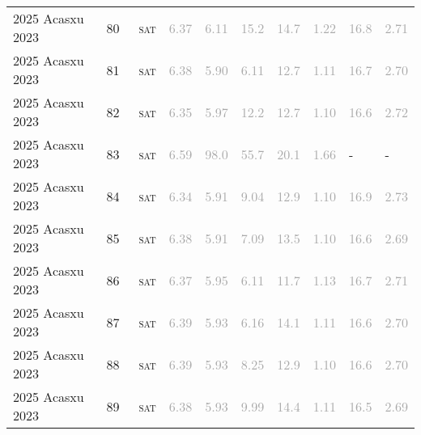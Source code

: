 \begin{center}
{\begin{longtable}{@{}llllllllll@{}}
2025 Acasxu 2023 & 80 & ~\textsc{sat} & \textcolor{darkgray}{6.37} & \textcolor{darkgray}{6.11} & \textcolor{darkgray}{15.2} & \textcolor{darkgray}{14.7} & \textcolor{darkgray}{1.22} & \textcolor{darkgray}{16.8} & \textcolor{darkgray}{2.71} \\
2025 Acasxu 2023 & 81 & ~\textsc{sat} & \textcolor{darkgray}{6.38} & \textcolor{darkgray}{5.90} & \textcolor{darkgray}{6.11} & \textcolor{darkgray}{12.7} & \textcolor{darkgray}{1.11} & \textcolor{darkgray}{16.7} & \textcolor{darkgray}{2.70} \\
2025 Acasxu 2023 & 82 & ~\textsc{sat} & \textcolor{darkgray}{6.35} & \textcolor{darkgray}{5.97} & \textcolor{darkgray}{12.2} & \textcolor{darkgray}{12.7} & \textcolor{darkgray}{1.10} & \textcolor{darkgray}{16.6} & \textcolor{darkgray}{2.72} \\
2025 Acasxu 2023 & 83 & ~\textsc{sat} & \textcolor{darkgray}{6.59} & \textcolor{darkgray}{98.0} & \textcolor{darkgray}{55.7} & \textcolor{darkgray}{20.1} & \textcolor{darkgray}{1.66} & - & - \\
2025 Acasxu 2023 & 84 & ~\textsc{sat} & \textcolor{darkgray}{6.34} & \textcolor{darkgray}{5.91} & \textcolor{darkgray}{9.04} & \textcolor{darkgray}{12.9} & \textcolor{darkgray}{1.10} & \textcolor{darkgray}{16.9} & \textcolor{darkgray}{2.73} \\
2025 Acasxu 2023 & 85 & ~\textsc{sat} & \textcolor{darkgray}{6.38} & \textcolor{darkgray}{5.91} & \textcolor{darkgray}{7.09} & \textcolor{darkgray}{13.5} & \textcolor{darkgray}{1.10} & \textcolor{darkgray}{16.6} & \textcolor{darkgray}{2.69} \\
2025 Acasxu 2023 & 86 & ~\textsc{sat} & \textcolor{darkgray}{6.37} & \textcolor{darkgray}{5.95} & \textcolor{darkgray}{6.11} & \textcolor{darkgray}{11.7} & \textcolor{darkgray}{1.13} & \textcolor{darkgray}{16.7} & \textcolor{darkgray}{2.71} \\
2025 Acasxu 2023 & 87 & ~\textsc{sat} & \textcolor{darkgray}{6.39} & \textcolor{darkgray}{5.93} & \textcolor{darkgray}{6.16} & \textcolor{darkgray}{14.1} & \textcolor{darkgray}{1.11} & \textcolor{darkgray}{16.6} & \textcolor{darkgray}{2.70} \\
2025 Acasxu 2023 & 88 & ~\textsc{sat} & \textcolor{darkgray}{6.39} & \textcolor{darkgray}{5.93} & \textcolor{darkgray}{8.25} & \textcolor{darkgray}{12.9} & \textcolor{darkgray}{1.10} & \textcolor{darkgray}{16.6} & \textcolor{darkgray}{2.70} \\
2025 Acasxu 2023 & 89 & ~\textsc{sat} & \textcolor{darkgray}{6.38} & \textcolor{darkgray}{5.93} & \textcolor{darkgray}{9.99} & \textcolor{darkgray}{14.4} & \textcolor{darkgray}{1.11} & \textcolor{darkgray}{16.5} & \textcolor{darkgray}{2.69} \\

\end{longtable}}
\end{center}

